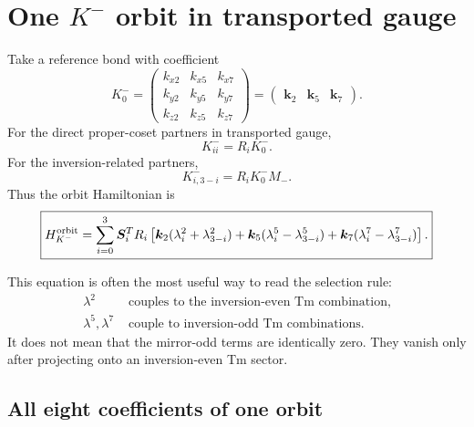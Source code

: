 \documentclass[11pt,a4paper]{article}
\newcommand{\ve}[1]{\boldsymbol{#1}}
\begin{document}
\section{One $K^-$ orbit in transported gauge}

Take a reference bond with coefficient
\begin{equation}
  K_0^-=
  \begin{pmatrix}
    k_{x2}&k_{x5}&k_{x7}\\
    k_{y2}&k_{y5}&k_{y7}\\
    k_{z2}&k_{z5}&k_{z7}
  \end{pmatrix}
  =\begin{pmatrix}\ve k_2&\ve k_5&\ve k_7\end{pmatrix}.
\end{equation}
For the direct proper-coset partners in transported gauge,
\begin{equation}
  K^-_{ii}=R_iK_0^-.
\end{equation}
For the inversion-related partners,
\begin{equation}
  K^-_{i,3-i}=R_iK_0^-M_-.
\end{equation}
Thus the orbit Hamiltonian is
\begin{equation}
  \boxed{
  H_{K^-}^{\rm orbit}
  =\sum_{i=0}^{3}\ve S_i^TR_i
  \left[
    \ve k_2(\lambda_i^2+\lambda_{3-i}^2)
    +\ve k_5(\lambda_i^5-\lambda_{3-i}^5)
    +\ve k_7(\lambda_i^7-\lambda_{3-i}^7)
  \right].}
  \label{eq:orbit-formula}
\end{equation}

This equation is often the most useful way to read the selection rule:
\begin{align}
  \lambda^2 &\text{ couples to the inversion-even Tm combination},\\
  \lambda^5,\lambda^7 &\text{ couple to inversion-odd Tm combinations}.
\end{align}
It does not mean that the mirror-odd terms are identically zero.  They vanish only after projecting onto an inversion-even Tm sector.

\subsection{All eight coefficients of one orbit}
\end{document}
